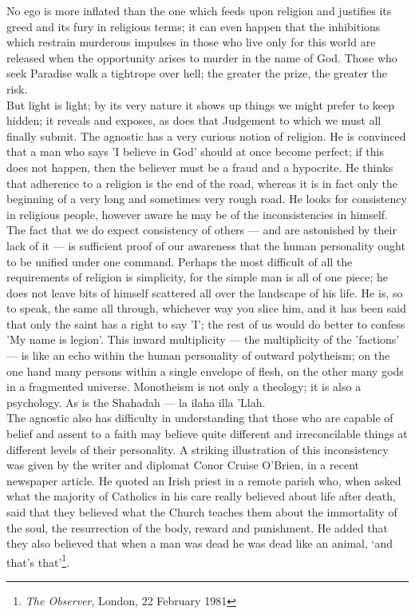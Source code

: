 \documentclass[10pt, twoside]{book}
\begin{document}
No ego is more inflated than the one which feeds upon religion and justifies its greed and its fury 
in religious terms; it can even happen that the inhibitions which restrain murderous impulses in 
those who live only for this world are released when the opportunity arises to murder in the name of 
God. Those who seek Paradise walk a tightrope over hell; the greater the prize, the greater the risk. \\

But light is light; by its very nature it shows up things we might prefer to keep hidden; it reveals 
and exposes, as does that Judgement to which we must all finally submit. The agnostic has a very 
curious notion of religion. He is convinced that a man who says 'I believe in God' should at once 
become perfect; if this does not happen, then the believer must be a fraud and a hypocrite. He thinks 
that adherence to a religion is the end of the road, whereas it is in fact only the beginning of a 
very long and sometimes very rough road. He looks for consistency in religious people, however aware 
he may be of the inconsistencies in himself. \\

The fact that we do expect consistency of others --- and are astonished by their lack of it --- is 
sufficient proof of our awareness that the human personality ought to be unified under one command. 
Perhaps the most difficult of all the requirements of religion is simplicity, for the simple man is 
all of one piece; he does not leave bits of himself scattered all over the landscape of his life. He 
is, so to speak, the same all through, whichever way you slice him, and it has been said that only 
the saint has a right to say 'I'; the rest of us would do better to confess 'My name is legion'. This 
inward multiplicity --- the multiplicity of the 'factions' --- is like an echo within the human 
personality of outward polytheism; on the one hand many persons within a single envelope of flesh, on 
the other many gods in a fragmented universe. Monotheism is not only a theology; it is also a 
psychology. As is the Shahadah --- la ilaha illa 'Llah. \\

The agnostic also has difficulty in understanding that those who are capable of belief and assent to 
a faith may believe quite different and irreconcilable things at different levels of their 
personality. A striking illustration of this inconsistency was given by the writer and diplomat Conor 
Cruise O'Brien, in a recent newspaper article. He quoted an Irish priest in a remote parish who, when 
asked what the majority of Catholics in his care really believed about life after death, said that 
they believed what the Church teaches them about the immortality of the soul, the resurrection of the 
body, reward and punishment. He added that they also believed that when a man was dead he was dead 
like an animal, `and that's that'\footnote{\emph{The Observer}, London, 22 February 1981}.\\
\end{document}
